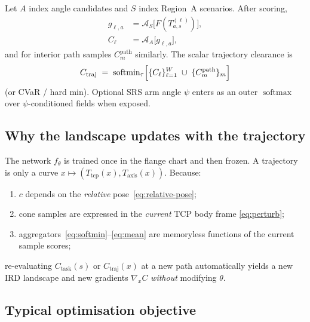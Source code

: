 \documentclass[11pt,a4paper]{article}
\newcommand{\Tcp}{T_{\mathrm{tcp}}}
\newcommand{\Taxis}{T_{\mathrm{axis}}}
\newcommand{\softmin}{\operatorname{softmin}}
\newcommand{\softmax}{\operatorname{softmax}}
\begin{document}
Let \(A\) index angle candidates and \(S\) index Region~A scenarios. After
scoring,
\begin{equation}
\label{eq:waypoint-clearance}
\begin{aligned}
  g_{\ell,a}
  &=
  \mathcal{A}_{S}\bigl[F(T^{(\ell)}_{a,s})\bigr],
  \\
  C_{\ell}
  &=
  \mathcal{A}_{A}\bigl[g_{\ell,a}\bigr],
\end{aligned}
\end{equation}
and for interior path samples \(C^{\mathrm{path}}_{m}\) similarly. The scalar
trajectory clearance is
\begin{equation}
\label{eq:traj-clearance}
  C_{\mathrm{traj}}
  \;=\;
  \softmin_{\tau}
  \Bigl[
    \{C_{\ell}\}_{\ell=1}^{W}
    \;\cup\;
    \{C^{\mathrm{path}}_{m}\}_{m}
  \Bigr]
\end{equation}
(or CVaR / hard min). Optional SRS arm angle \(\psi\) enters as an outer
\(\softmax\) over \(\psi\)-conditioned fields when exposed.

\subsection{Why the landscape updates with the trajectory}
\label{sec:why-update}

The network \(f_{\theta}\) is trained once in the flange chart and then frozen.
A trajectory is only a curve \(x\mapsto(\Tcp(x),\Taxis(x))\). Because:
\begin{enumerate}[leftmargin=1.6em]
  \item \(c\) depends on the \emph{relative} pose~\eqref{eq:relative-pose};
  \item cone samples are expressed in the \emph{current} TCP body frame
        \eqref{eq:perturb};
  \item aggregators~\eqref{eq:softmin}--\eqref{eq:mean} are memoryless
        functions of the current sample scores;
\end{enumerate}
re-evaluating \(C_{\mathrm{task}}(s)\) or \(C_{\mathrm{traj}}(x)\) at a new
path automatically yields a new IRD landscape and new gradients
\(\nabla_{x}C\) \emph{without} modifying \(\theta\).

\subsection{Typical optimisation objective}
\label{sec:opt}
\end{document}
